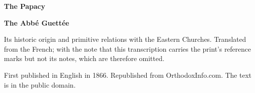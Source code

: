 \documentclass[11pt,letterpaper]{article}
\begin{document}
\color{ink}

\begin{titlepage}
\centering
\vspace*{4em}
{\LARGE\bfseries\color{heading} The Papacy\par}
\vspace{2em}
{\Large\bfseries\color{heading} The Abb\'e Guett\'ee\par}
\vspace{2.5em}
{\itshape\color{subhead}\parbox{0.8\linewidth}{\centering Its historic origin and primitive relations with the Eastern Churches. Translated from the French; with the note that this transcription carries the print's reference marks but not its notes, which are therefore omitted.\par}}
\vfill
{\small First published in English in 1866. Republished from OrthodoxInfo.com. The text is in the public domain.\par}
\vspace{2em}
\end{titlepage}

\tableofcontents


\end{document}
